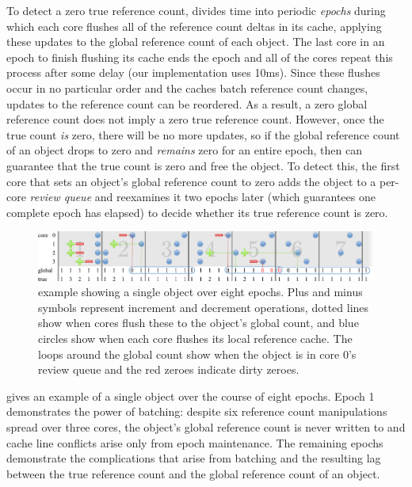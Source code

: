To detect a zero true reference count,  divides time into
periodic \emph{epochs} during which each core flushes all of the
reference count deltas in its cache, applying these updates to the
global reference count of each object.  The last core in an epoch to
finish flushing its cache ends the epoch and all of the cores repeat
this process after some delay (our implementation uses 10ms).  Since
these flushes occur in no particular order and the caches batch
reference count changes, updates to the reference count can be
reordered.  As a result, a zero global reference count does not imply
a zero true reference count.  However, once the true count \emph{is}
zero, there will be no more updates, so if the global reference count
of an object drops to zero and \emph{remains} zero for an entire
epoch, then  can guarantee that the true count is zero
and free the object.  To detect this, the first core that sets an object's
global reference count to zero adds the object to a per-core
\emph{review queue} and reexamines it two epochs later (which
guarantees one complete epoch has elapsed) to decide whether its true
reference count is zero.

\begin{figure}
  \centering
  \includegraphics[width=\textwidth]{figures/refcache.pdf}
  \caption{ example showing a single object over eight
    epochs.  Plus and minus symbols represent increment and decrement
    operations, dotted lines show when cores flush these to the object's
    global count, and blue circles show when each core flushes its
    local reference cache.  The loops around the global count show
    when the object is in core 0's review queue and
    the red zeroes indicate dirty zeroes.}
  \label{fig:refcache-ex}
\end{figure}

 gives an example of a single object over
the course of eight epochs.  Epoch 1 demonstrates the power of
batching: despite six reference count manipulations spread over three
cores, the object's global reference count is never written to and
cache line conflicts arise only from epoch maintenance.  The
remaining epochs demonstrate the complications that arise from
batching and the resulting lag between the true reference count and
the global reference count of an object.

